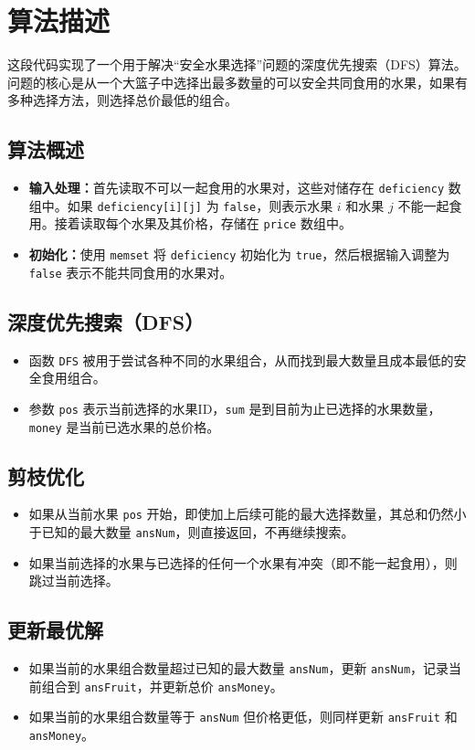 \documentclass{ctexart} %
\begin{document}
\section*{算法描述}
这段代码实现了一个用于解决``安全水果选择''问题的深度优先搜索（DFS）算法。问题的核心是从一个大篮子中选择出最多数量的可以安全共同食用的水果，如果有多种选择方法，则选择总价最低的组合。

\subsection*{算法概述}
\begin{itemize}
    \item \textbf{输入处理：}首先读取不可以一起食用的水果对，这些对储存在 \texttt{deficiency} 数组中。如果 \texttt{deficiency[i][j]} 为 \texttt{false}，则表示水果 $i$ 和水果 $j$ 不能一起食用。接着读取每个水果及其价格，存储在 \texttt{price} 数组中。
    \item \textbf{初始化：}使用 \texttt{memset} 将 \texttt{deficiency} 初始化为 \texttt{true}，然后根据输入调整为 \texttt{false} 表示不能共同食用的水果对。
\end{itemize}

\subsection*{深度优先搜索（DFS）}
\begin{itemize}
    \item 函数 \texttt{DFS} 被用于尝试各种不同的水果组合，从而找到最大数量且成本最低的安全食用组合。
    \item 参数 \texttt{pos} 表示当前选择的水果ID，\texttt{sum} 是到目前为止已选择的水果数量，\texttt{money} 是当前已选水果的总价格。
\end{itemize}

\subsection*{剪枝优化}
\begin{itemize}
    \item 如果从当前水果 \texttt{pos} 开始，即使加上后续可能的最大选择数量，其总和仍然小于已知的最大数量 \texttt{ansNum}，则直接返回，不再继续搜索。
    \item 如果当前选择的水果与已选择的任何一个水果有冲突（即不能一起食用），则跳过当前选择。
\end{itemize}

\subsection*{更新最优解}
\begin{itemize}
    \item 如果当前的水果组合数量超过已知的最大数量 \texttt{ansNum}，更新 \texttt{ansNum}，记录当前组合到 \texttt{ansFruit}，并更新总价 \texttt{ansMoney}。
    \item 如果当前的水果组合数量等于 \texttt{ansNum} 但价格更低，则同样更新 \texttt{ansFruit} 和 \texttt{ansMoney}。
\end{itemize}
\end{document}
